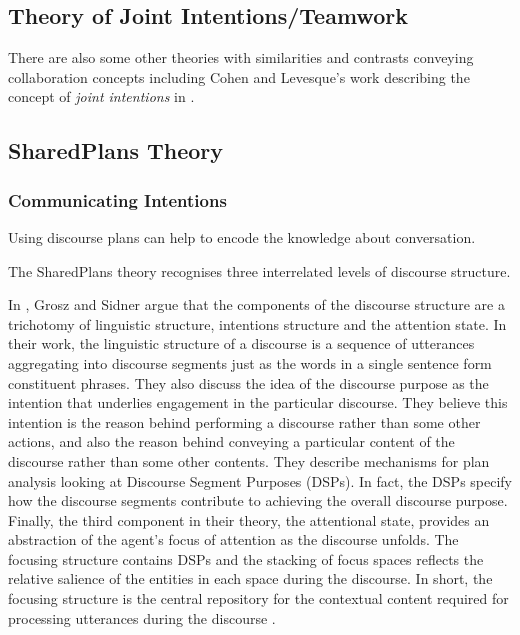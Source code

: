 \documentclass[11pt]{article}
\begin{document}
\subsection{Theory of Joint Intentions/Teamwork}

There are also some other theories with similarities and contrasts conveying
collaboration concepts including Cohen and Levesque's work describing the
concept of \textit{joint intentions} in \cite{cohen:teamwork,
levesque:acting-together}.

\subsection{SharedPlans Theory}
\label{sec:sharedplans}

\subsubsection{Communicating Intentions}

Using discourse plans can help to encode the knowledge about conversation.

The SharedPlans theory recognises three interrelated levels of discourse
structure.

In \cite{grosz:plans-discourse}, Grosz and Sidner argue that the components of
the discourse structure are a trichotomy of linguistic structure, intentions
structure and the attention state. In their work, the linguistic structure of a
discourse is a sequence of utterances aggregating into discourse segments just
as the words in a single sentence form constituent phrases. They also discuss
the idea of the discourse purpose as the intention that underlies engagement in
the particular discourse. They believe this intention is the reason behind
performing a discourse rather than some other actions, and also the reason
behind conveying a particular content of the discourse rather than some other
contents. They describe mechanisms for plan analysis looking at Discourse
Segment Purposes (DSPs). In fact, the DSPs specify how the discourse segments
contribute to achieving the overall discourse purpose. Finally, the third
component in their theory, the attentional state, provides an abstraction of the
agent's focus of attention as the discourse unfolds. The focusing structure
contains DSPs and the stacking of focus spaces reflects the relative salience of
the entities in each space during the discourse. In short, the focusing
structure is the central repository for the contextual content required for
processing utterances during the discourse \cite{grosz:plans-discourse}.
\end{document}
